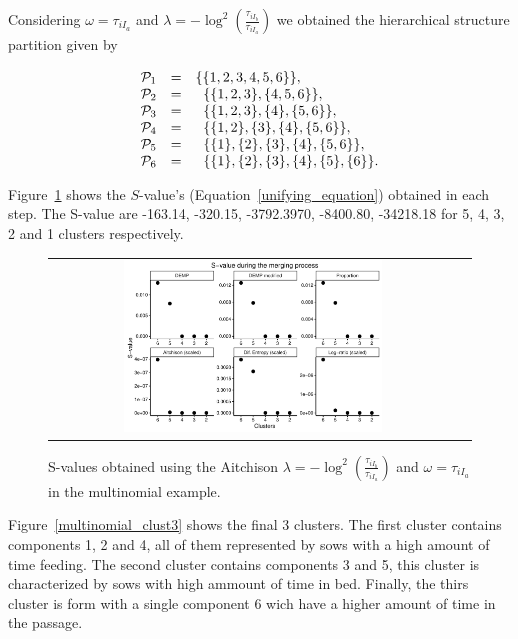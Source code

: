 \documentclass[submit]{smj}
\theoremstyle{definition}
\begin{document}
Considering $\omega = \tau_{i I_a}$ and $\lambda = -\log^2 \left(\frac{ \tau_{iI_b} }{ \tau_{iI_a} }\right)$ we obtained the hierarchical structure partition given by


\begin{equation}
\begin{array}{r c l}
 \mathcal{P}_1&=& \{\{1,2,3,4,5,6\}\}, \\ 
 \mathcal{P}_2&=& \;\; \{\{1,2,3\},\{4,5,6\}\}, \\ 
 \mathcal{P}_3&=& \;\; \{\{1,2,3\},\{4\},\{5,6\}\}, \\ 
 \mathcal{P}_4&=& \;\; \{\{1,2\},\{3\},\{4\},\{5,6\}\}, \\ 
 \mathcal{P}_5&=& \;\; \{\{1\},\{2\},\{3\},\{4\},\{5,6\}\}, \\ 
 \mathcal{P}_6&=& \;\; \{\{1\},\{2\},\{3\},\{4\},\{5\},\{6\}\}.
\end{array}
\label{hier_ex_multinomial}
\end{equation}

Figure~\ref{multinomial_Svalues} shows the $S$-value's (Equation~\ref{unifying_equation}) obtained in each step. The S-value are -163.14,   -320.15,  -3792.3970,  -8400.80, -34218.18 for 5, 4, 3, 2 and 1 clusters respectively.

\begin{figure}[t]
\begin{center}
\begin{tabular}{cc}
  \includegraphics[width=0.65\textwidth]{figures/multinomial_Svalues_all.pdf} \\
 \end{tabular}
 \caption{S-values obtained using the Aitchison $\lambda = -\log^2 \left(\frac{ \tau_{iI_b} }{ \tau_{iI_a} }\right)$ and $\omega = \tau_{i I_a}$ in the multinomial example.}\label{multinomial_Svalues}
\end{center}
\end{figure}

Figure~\ref{multinomial_clust3} shows the final 3 clusters. The first cluster contains components 1, 2 and 4, all of them represented by sows with a high amount of time feeding. The second cluster contains components 3 and 5, this cluster is characterized by sows with high ammount of time in bed. Finally, the thirs cluster is form with a single component 6 wich have a higher amount of time in the passage.
\end{document}
